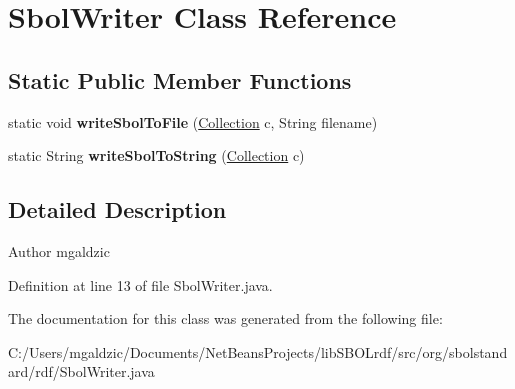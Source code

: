 \hypertarget{classorg_1_1sbolstandard_1_1rdf_1_1_sbol_writer}{
\section{SbolWriter Class Reference}
\label{classorg_1_1sbolstandard_1_1rdf_1_1_sbol_writer}
}
\subsection*{Static Public Member Functions}
\begin{DoxyCompactItemize}
\item 
\hypertarget{classorg_1_1sbolstandard_1_1rdf_1_1_sbol_writer_a310a3f0aa2500560453ba8be6db086dd}{
static void {\bfseries writeSbolToFile} (\hyperlink{interfaceorg_1_1sbolstandard_1_1core_1_1_collection}{Collection} c, String filename)}
\label{classorg_1_1sbolstandard_1_1rdf_1_1_sbol_writer_a310a3f0aa2500560453ba8be6db086dd}

\item 
\hypertarget{classorg_1_1sbolstandard_1_1rdf_1_1_sbol_writer_a64630eea69d44c0176552272c8cbcf57}{
static String {\bfseries writeSbolToString} (\hyperlink{interfaceorg_1_1sbolstandard_1_1core_1_1_collection}{Collection} c)}
\label{classorg_1_1sbolstandard_1_1rdf_1_1_sbol_writer_a64630eea69d44c0176552272c8cbcf57}

\end{DoxyCompactItemize}


\subsection{Detailed Description}
\begin{DoxyAuthor}{Author}
mgaldzic 
\end{DoxyAuthor}


Definition at line 13 of file SbolWriter.java.



The documentation for this class was generated from the following file:\begin{DoxyCompactItemize}
\item 
C:/Users/mgaldzic/Documents/NetBeansProjects/libSBOLrdf/src/org/sbolstandard/rdf/SbolWriter.java\end{DoxyCompactItemize}
